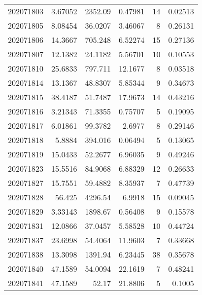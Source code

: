 \begin{tabular}{rrrrrr}
 202071803 &          3.67052 &     2352.09   &            0.47981 &          14 & 0.02513 \\
 202071805 &          8.08454 &       36.0207 &            3.46067 &           8 & 0.26131 \\
 202071806 &         14.3667  &      705.248  &            6.52274 &          15 & 0.27136 \\
 202071807 &         12.1382  &       24.1182 &            5.56701 &          10 & 0.10553 \\
 202071810 &         25.6833  &      797.711  &           12.1677  &           8 & 0.03518 \\
 202071814 &         13.1367  &       48.8307 &            5.85344 &           9 & 0.34673 \\
 202071815 &         38.4187  &       51.7487 &           17.9673  &          14 & 0.43216 \\
 202071816 &          3.21343 &       71.3355 &            0.75707 &           5 & 0.19095 \\
 202071817 &          6.01861 &       99.3782 &            2.6977  &           8 & 0.29146 \\
 202071818 &          5.8884  &      394.016  &            0.06494 &           5 & 0.13065 \\
 202071819 &         15.0433  &       52.2677 &            6.96035 &           9 & 0.49246 \\
 202071823 &         15.5516  &       84.9068 &            6.88329 &          12 & 0.26633 \\
 202071827 &         15.7551  &       59.4882 &            8.35937 &           7 & 0.47739 \\
 202071828 &         56.425   &     4296.54   &            6.9918  &          15 & 0.09045 \\
 202071829 &          3.33143 &     1898.67   &            0.56408 &           9 & 0.15578 \\
 202071831 &         12.0866  &       37.0457 &            5.58528 &          10 & 0.44724 \\
 202071837 &         23.6998  &       54.4064 &           11.9603  &           7 & 0.33668 \\
 202071838 &         13.3098  &     1391.94   &            6.23445 &          38 & 0.35678 \\
 202071840 &         47.1589  &       54.0094 &           22.1619  &           7 & 0.48241 \\
 202071841 &         47.1589  &       52.17   &           21.8806  &           5 & 0.1005  \\

\end{tabular}
